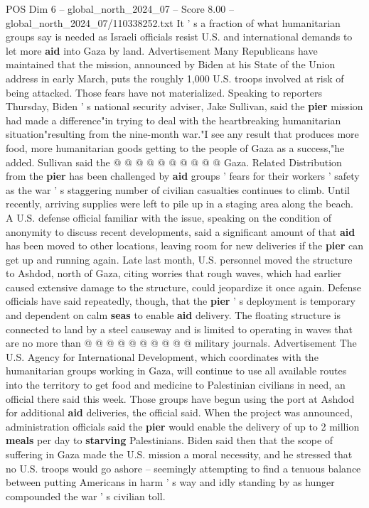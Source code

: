 \begin{textsample}{POS Dim 6 – global\_north\_2024\_07 – Score 8.00 – global\_north\_2024\_07/110338252.txt}
It ' s a fraction of what humanitarian groups say is needed as Israeli officials resist U.S. and international demands to let more \textbf{aid} into Gaza by land.
Advertisement Many Republicans have maintained that the mission, announced by Biden at his State of the Union address in early March, puts the roughly 1,000 U.S. troops involved at risk of being attacked.
Those fears have not materialized.
Speaking to reporters Thursday, Biden ' s national security adviser, Jake Sullivan, said the \textbf{pier} mission had made a difference"in trying to deal with the heartbreaking humanitarian situation"resulting from the nine-month war."I see any result that produces more food, more humanitarian goods getting to the people of Gaza as a success,"he added.
Sullivan said the @ @ @ @ @ @ @ @ @ @ Gaza.
Related Distribution from the \textbf{pier} has been challenged by \textbf{aid} groups ' fears for their workers ' safety as the war ' s staggering number of civilian casualties continues to climb.
Until recently, arriving supplies were left to pile up in a staging area along the beach.
A U.S. defense official familiar with the issue, speaking on the condition of anonymity to discuss recent developments, said a significant amount of that \textbf{aid} has been moved to other locations, leaving room for new deliveries if the \textbf{pier} can get up and running again.
Late last month, U.S. personnel moved the structure to Ashdod, north of Gaza, citing worries that rough waves, which had earlier caused extensive damage to the structure, could jeopardize it once again.
Defense officials have said repeatedly, though, that the \textbf{pier} ' s deployment is temporary and dependent on calm \textbf{seas} to enable \textbf{aid} delivery.
The floating structure is connected to land by a steel causeway and is limited to operating in waves that are no more than @ @ @ @ @ @ @ @ @ @ military journals.
Advertisement The U.S.
Agency for International Development, which coordinates with the humanitarian groups working in Gaza, will continue to use all available routes into the territory to get food and medicine to Palestinian civilians in need, an official there said this week.
Those groups have begun using the port at Ashdod for additional \textbf{aid} deliveries, the official said.
When the project was announced, administration officials said the \textbf{pier} would enable the delivery of up to 2 million \textbf{meals} per day to \textbf{starving} Palestinians.
Biden said then that the scope of suffering in Gaza made the U.S. mission a moral necessity, and he stressed that no U.S. troops would go ashore -- seemingly attempting to find a tenuous balance between putting Americans in harm ' s way and idly standing by as hunger compounded the war ' s civilian toll.

\end{textsample}
